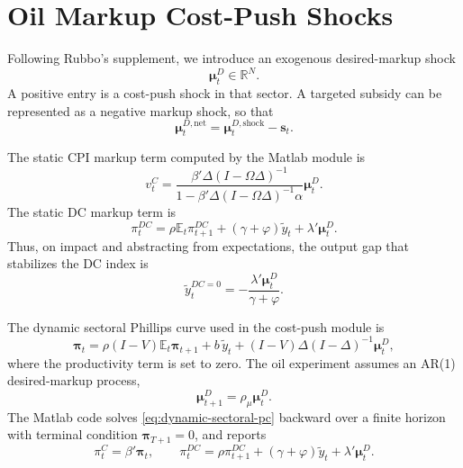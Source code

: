 \documentclass[12pt]{article}
\newcommand{\E}{\mathbb{E}}
\newcommand{\ytilde}{\tilde y}
\begin{document}
\section{Oil Markup Cost-Push Shocks}
\label{sec:costpush}

Following Rubbo's supplement, we introduce an exogenous desired-markup shock
\begin{equation}
    \bm{\mu}^D_t \in \mathbb{R}^{N}.
    \label{eq:markup-shock}
\end{equation}
A positive entry is a cost-push shock in that sector. A targeted subsidy can be
represented as a negative markup shock, so that
\begin{equation}
    \bm{\mu}^{D,\mathrm{net}}_t
    =
    \bm{\mu}^{D,\mathrm{shock}}_t
    -
    \bm{s}_t .
    \label{eq:subsidy}
\end{equation}

The static CPI markup term computed by the Matlab module is
\begin{equation}
    v^C_t
    =
    \frac{\beta'\Delta(I-\Omega\Delta)^{-1}}
    {1-\beta'\Delta(I-\Omega\Delta)^{-1}\alpha}
    \bm{\mu}^D_t .
    \label{eq:cpi-markup}
\end{equation}
The static DC markup term is
\begin{equation}
    \pi_t^{DC}
    =
    \rho\E_t\pi_{t+1}^{DC}
    +
    (\gamma+\varphi)\ytilde_t
    +
    \lambda'\bm{\mu}^D_t .
    \label{eq:dc-markup}
\end{equation}
Thus, on impact and abstracting from expectations, the output gap that stabilizes the
DC index is
\begin{equation}
    \ytilde_t^{DC=0}
    =
    -\frac{\lambda'\bm{\mu}^D_t}{\gamma+\varphi}.
    \label{eq:dc-output-gap}
\end{equation}

The dynamic sectoral Phillips curve used in the cost-push module is
\begin{equation}
    \bm{\pi}_t
    =
    \rho(I-V)\E_t\bm{\pi}_{t+1}
    +
    b\,\ytilde_t
    +
    (I-V)\Delta(I-\Delta)^{-1}\bm{\mu}^D_t,
    \label{eq:dynamic-sectoral-pc}
\end{equation}
where the productivity term is set to zero. The oil experiment assumes an AR(1)
desired-markup process,
\begin{equation}
    \bm{\mu}^D_{t+1}
    =
    \rho_\mu \bm{\mu}^D_t.
    \label{eq:markup-ar}
\end{equation}
The Matlab code solves \eqref{eq:dynamic-sectoral-pc} backward over a finite horizon
with terminal condition $\bm{\pi}_{T+1}=0$, and reports
\begin{equation}
    \pi_t^C=\beta'\bm{\pi}_t,
    \qquad
    \pi_t^{DC}
    =
    \rho\pi_{t+1}^{DC}
    +
    (\gamma+\varphi)\ytilde_t
    +
    \lambda'\bm{\mu}^D_t.
    \label{eq:reported-inflation}
\end{equation}
\end{document}
